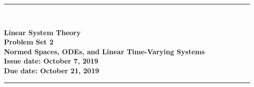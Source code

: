 \documentclass[fleqn,12pt, a4paper]{article}
\theoremstyle{definition}
\numberwithin{equation}{section}
\begin{document}
\thispagestyle{plain}

\vspace*{-1.5cm}
{\noindent \rule{15.8cm}{.3mm} \\[.3cm]}
\begin{center} \bf
{\large Linear System Theory \medskip
\\
Problem Set 2 \\
Normed Spaces, ODEs, and Linear Time-Varying Systems\medskip
\\ Issue date: October 7, 2019
\\ Due date: October 21, 2019}
\end{center}
\rule{15.8cm}{.3mm} \\[0cm]
\end{document}
